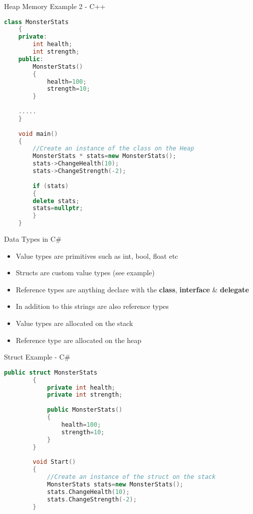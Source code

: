 \begin{frame}[fragile]{Heap Memory Example 2 - C++}
\begin{lstlisting}[language=C++,basicstyle=\tiny,]
	class MonsterStats
	{
	private:
		int health;
		int strength;
	public:
		MonsterStats()
		{
			health=100;
			strength=10;
		}
		
	.....
	}
	
	void main()
	{		
		//Create an instance of the class on the Heap
		MonsterStats * stats=new MonsterStats();
		stats->ChangeHealth(10);
		stats->ChangeStrength(-2);
	
		if (stats)
		{
		delete stats;
		stats=nullptr;
		}
	}
\end{lstlisting}
\end{frame}

\begin{frame}{Data Types in C\#}
	\begin{itemize}
		\item Value types are primitives such as int, bool, float etc
		\item Structs are custom value types (see example)
		\item Reference types are anything declare with the \textbf{class}, \textbf{interface} \& \textbf{delegate}
		\item In addition to this strings are also reference types
		\item Value types are allocated on the stack
		\item Reference type are allocated on the heap
	\end{itemize}
\end{frame}

\begin{frame}[fragile]{Struct Example - C\#}
	\begin{lstlisting}[language=C++,basicstyle=\tiny,]
		public struct MonsterStats
		{
			private int health;
			private int strength;
			
			public MonsterStats()
			{
				health=100;
				strength=10;
			}
		}
	
		void Start()
		{		
			//Create an instance of the struct on the stack
			MonsterStats stats=new MonsterStats();
			stats.ChangeHealth(10);
			stats.ChangeStrength(-2);
		}	
	\end{lstlisting}
\end{frame}

